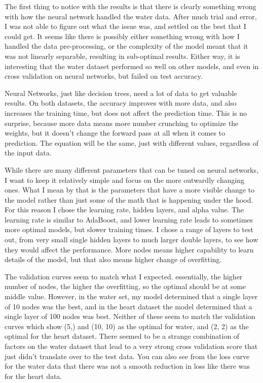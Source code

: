 \documentclass[
	letterpaper, %
]{mlreport}
\begin{document}
The first thing to notice with the results is that there is clearly something wrong with how the neural network handled the water data. After much trial and error, I was not able to figure out what the issue was, and settled on the best that I could get. It seems like there is possibly either something wrong with how I handled the data pre-processing, or the complexity of the model meant that it was not linearly separable, resulting in sub-optimal results. Either way, it is interesting that the water dataset performed so well on other models, and even in cross validation on neural networks, but failed on test accuracy.

Neural Networks, just like decision trees, need a lot of data to get valuable results. On both datasets, the accuracy improves with more data, and also increases the training time, but does not affect the prediction time. This is no surprise, because more data means more number crunching to optimize the weights, but it doesn't change the forward pass at all when it comes to prediction. The equation will be the same, just with different values, regardless of the input data.

While there are many different parameters that can be tuned on neural networks, I want to keep it relatively simple and focus on the more outwardly changing ones. What I mean by that is the parameters that have a more visible change to the model rather than just some of the math that is happening under the hood. For this reason I chose the learning rate, hidden layers, and alpha value. The learning rate is similar to AdaBoost, and lower learning rate leads to sometimes more optimal models, but slower training times. I chose a range of layers to test out, from very small single hidden layers to much larger double layers, to see how they would affect the performance. More nodes means higher capability to learn details of the model, but that also means higher change of overfitting.

The validation curves seem to match what I expected. essentially, the higher number of nodes, the higher the overfitting, so the optimal should be at some middle value. However, in the water set, my model determined that a single layer of 10 nodes was the best, and in the heart dataset the model determined that a single layer of 100 nodes was best. Neither of these seem to match the validation curves which show (5,) and (10, 10) as the optimal for water, and (2, 2) as the optimal for the heart dataset. There seemed to be a strange combination of factors on the water dataset that lead to a very strong cross validation score that just didn't translate over to the test data. You can also see from the loss curve for the water data that there was not a smooth reduction in loss like there was for the heart data.
\end{document}
